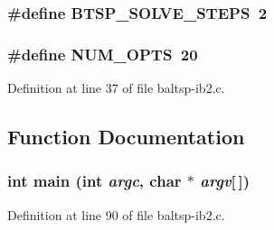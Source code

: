 \hypertarget{bin_2baltsp-ib2_8c_83255427b2f2f52d715e7b88d97ce089}{
\subsubsection[{BTSP\_\-SOLVE\_\-STEPS}]{\setlength{\rightskip}{0pt plus 5cm}\#define BTSP\_\-SOLVE\_\-STEPS~2}}
\label{bin_2baltsp-ib2_8c_83255427b2f2f52d715e7b88d97ce089}


\hypertarget{bin_2baltsp-ib2_8c_9b58b2c4af931c8486a986c9deca40f5}{
\subsubsection[{NUM\_\-OPTS}]{\setlength{\rightskip}{0pt plus 5cm}\#define NUM\_\-OPTS~20}}
\label{bin_2baltsp-ib2_8c_9b58b2c4af931c8486a986c9deca40f5}




Definition at line 37 of file baltsp-ib2.c.

\subsection{Function Documentation}
\hypertarget{bin_2baltsp-ib2_8c_0ddf1224851353fc92bfbff6f499fa97}{
\subsubsection[{main}]{\setlength{\rightskip}{0pt plus 5cm}int main (int {\em argc}, \/  char $\ast$ {\em argv}\mbox{[}$\,$\mbox{]})}}
\label{bin_2baltsp-ib2_8c_0ddf1224851353fc92bfbff6f499fa97}




Definition at line 90 of file baltsp-ib2.c.

